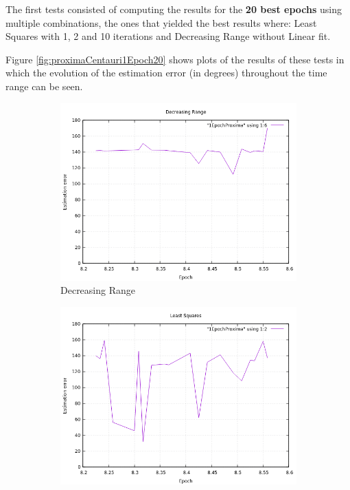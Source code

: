 The first tests consisted of computing the results for the \textbf{20 best epochs} using multiple combinations, the ones that yielded the best results where: Least Squares with 1, 2 and 10 iterations and Decreasing Range without Linear fit. 

Figure \ref{fig:proximaCentauri1Epoch20} shows plots of the results of these tests in which the evolution of the estimation error (in degrees) throughout the time range can be seen.

\begin{figure}[!htb]
	\begin{subfigure}[b]{0.5\textwidth}
		\includegraphics[width=\linewidth]{images/resultsStellar/20Epochs1Epoch/1EpochProximaDR.png}
		\caption{Decreasing Range}
	\end{subfigure}
	\hfill
	\begin{subfigure}[b]{0.5\textwidth}
		\includegraphics[width=\linewidth]{images/resultsStellar/20Epochs1Epoch/1EpochProximaLS1.png}

\end{subfigure}
\end{figure}
